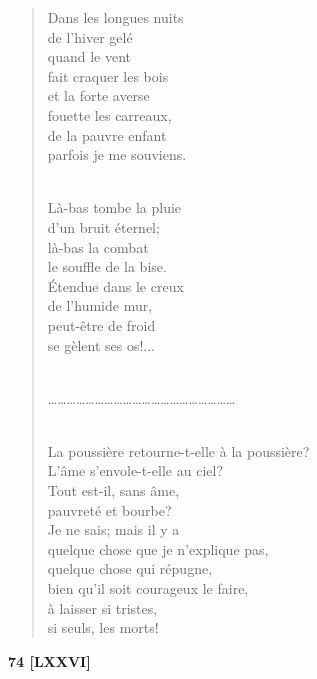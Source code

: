 \documentclass[a4paper,12pt]{book}
\begin{document}
\begin{verse}
Dans les longues nuits \\
de l'hiver gelé \\
quand le vent \\
fait craquer les bois \\
et la forte averse \\
fouette les carreaux, \\
de la pauvre enfant \\
parfois je me souviens. \\ \

Là-bas tombe la pluie \\
d'un bruit éternel; \\
là-bas la combat \\
le souffle de la bise. \\
Étendue dans le creux \\
de l'humide mur, \\
peut-être de froid \\
se gèlent ses os!... \\ \

\ldots\ldots\ldots\ldots\ldots\ldots\ldots\ldots\ldots\ldots\ldots\ldots\ldots\ldots\ldots\ldots\ldots\ldots\ldots\ldots \\ \

La poussière retourne-t-elle à la poussière? \\
L'âme s'envole-t-elle au ciel? \\
Tout est-il, sans âme, \\
pauvreté et bourbe? \\
Je ne sais; mais il y a \\
quelque chose que je n'explique pas, \\
quelque chose qui répugne, \\
bien qu'il soit courageux le faire, \\
à laisser si tristes, \\
si seuls, les morts! \\
\end{verse}

\bigskip

\begin{center} {\bf 74 [LXXVI]} \end{center}
\end{document}
